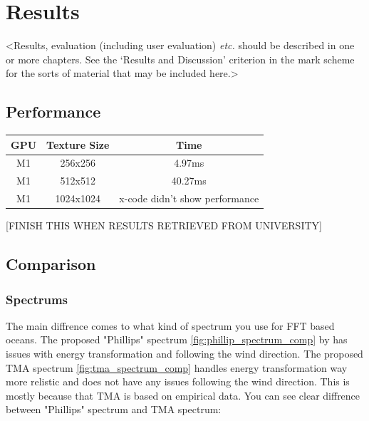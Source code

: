 \chapter{Results}
\label{chapter3}

<Results, evaluation (including user evaluation) {\em etc.} should be described in one or more chapters. See the `Results and Discussion' criterion in the mark scheme for the sorts of material that may be included here.>
\section{Performance}

\begin{table}[h]
    \centering
    \begin{tabular}{|c|c|c|}
        \hline
        \textbf{GPU} & \textbf{Texture Size} & \textbf{Time} \\
        \hline
        M1 & 256x256 & 4.97ms \\
        \hline
        M1 & 512x512 & 40.27ms \\
        \hline
        M1 & 1024x1024 & x-code didn't show performance \\
        \hline
    \end{tabular}
\end{table}

[FINISH THIS WHEN RESULTS RETRIEVED FROM UNIVERSITY]

\section{Comparison} 

\subsection{Spectrums}
The main diffrence comes to what kind of spectrum you use for FFT based oceans. The proposed "Phillips" spectrum \ref{fig:phillip_spectrum_comp} by \cite[J. Tessendorf]{tessendorf2001} has issues with energy transformation and following the wind direction. 
The proposed TMA spectrum \ref{fig:tma_spectrum_comp} handles energy transformation way more relistic and does not have any issues following the wind direction. This is mostly because that TMA is based on empirical data.
You can see clear diffrence between "Phillips" spectrum and TMA spectrum:

